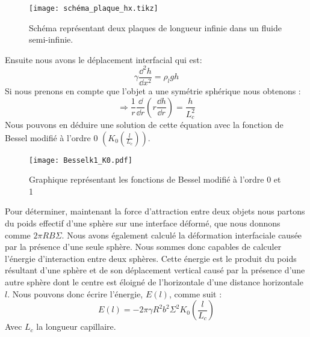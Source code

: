         \begin{figure}[!htb]
            \centering
            \texttt{[image: schéma\_plaque\_hx.tikz]}
            \caption{Schéma représentant deux plaques de longueur infinie dans un fluide semi-infinie.}
            \label{fig:h_and_x}
        \end{figure}
         Ensuite nous avons le déplacement interfacial\cite{introfluidcambridge} qui est:
        \begin{equation}
            \gamma \frac{\dd^2h}{\dd x^2} = \rho_l g h
        \end{equation}
        Si nous prenons en compte que l'objet a une symétrie sphérique nous obtenons :
        \begin{equation}
            \Rightarrow \frac{1}{r} \frac{\dd}{\dd r} \left( r\frac{\dd h}{\dd r}\right) = \frac{h}{L_c^2}
        \end{equation}
        Nous pouvons en déduire une solution de cette équation avec la fonction de Bessel modifié à l'ordre 0 \cite{introbessel} $(K_0\left(\frac{l}{L_c}\right))$.

        \begin{figure}[H]
            \centering
            \texttt{[image: Besselk1\_K0.pdf]}
            \caption{Graphique représentant les fonctions de Bessel modifié à l'ordre 0 et 1}
            \label{fig:bessel}
        \end{figure}

        Pour déterminer, maintenant la force d'attraction entre deux objets nous partons du poids effectif d'une sphère sur une interface déformé, que nous donnons comme \(2\pi RB\Sigma\). Nous avons également calculé la déformation interfaciale causée
        par la présence d'une seule sphère. Nous sommes donc capables de calculer l'énergie d'interaction entre deux sphères. Cette énergie est le produit du poids résultant d'une sphère et de son déplacement vertical causé par la présence d'une autre sphère dont le centre est éloigné de l'horizontale d'une distance horizontale $l$. Nous pouvons donc écrire l'énergie, $E(l)$, comme suit :
        \begin{equation}
            E(l)=-2\pi\gamma R^2b^2\Sigma^2K_0\left(\frac{l}{L_c}\right)
            \label{eq:energyInteraction}
        \end{equation}
        Avec $L_c$ la longueur capillaire.

